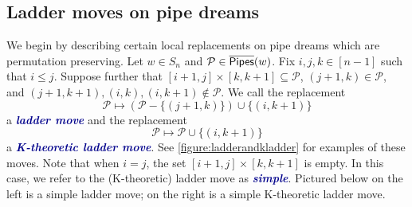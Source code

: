 \documentclass[12 pt]{amsart}
\newcommand{\newword}[1]{\textcolor{darkblue}{\textbf{\emph{#1}}}}
\numberwithin{equation}{section}
\theoremstyle{remark}
\newcommand{\kpipes}{\overline{\sf Pipes}}
\begin{document}
		\subsection{Ladder moves on pipe dreams}
		We begin by describing certain local replacements on pipe dreams which are permutation preserving. 
		Let $w \in S_n$ and $\mathcal{P} \in \kpipes(w)$. 
		Fix $i,j,k \in [n-1]$ such that $i\leq j$. Suppose further that $[i + 1, j] \times [k, k + 1] \subseteq \mathcal{P}$, $(j + 1,k) \in \mathcal{P}$, and $(j + 1,k + 1),(i,k),(i,k + 1)\notin \mathcal{P}$. 
		We call the replacement
		\[\mathcal{P} \mapsto (\mathcal{P}-\{(j + 1, k)\}) \cup \{(i, k + 1)\}\] 
		a \newword{ladder move} and the replacement 
		\[\mathcal{P} \mapsto \mathcal{P} \cup \{(i, k + 1)\}\] a \newword{K-theoretic ladder move}. 
		See \cref{figure:ladderandkladder} for examples of these moves.
		Note that when $i = j$, the set $[i + 1,j] \times [k,k + 1]$ is empty. 
		In this case, we refer to the (K-theoretic) ladder move as \newword{simple}. Pictured below on the left is a simple ladder move; on the right is a simple K-theoretic ladder move.
\end{document}
